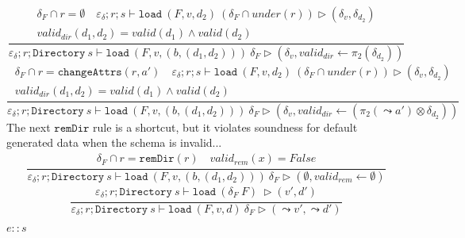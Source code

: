\documentclass{report}
\theoremstyle{theorem}
\begin{document}
\begin{displaymath}
	\frac{\begin{array}{c}
		\delta_F \cap r = \emptyset \quad
		\varepsilon_\delta ; r ; s \vdash \mathtt{load}~ (F,v,d_2)~ (\delta_F \cap under(r)) \rhd (\delta_v,\delta_{d_2})\\
		valid_{dir}(d_1,d_2) = valid(d_1) \wedge valid (d_2)
	\end{array}}
	{\varepsilon_\delta ; r ; \mathtt{Directory}~s \vdash \mathtt{load}~ (F,v,(b,(d_1,d_2)))~ \delta_F \rhd (\delta_v,valid_{dir} \leftarrow \pi_2(\delta_{d_2}))}
\end{displaymath}
\begin{displaymath}
	\frac{\begin{array}{c}
		\delta_F \cap r = \mathtt{changeAttrs}(r,a') \quad
		\varepsilon_\delta ; r ; s \vdash \mathtt{load}~ (F,v,d_2)~ (\delta_F \cap under(r)) \rhd (\delta_v,\delta_{d_2})\\
		valid_{dir}(d_1,d_2) = valid(d_1) \wedge valid (d_2)
	\end{array}}
	{\varepsilon_\delta ; r ; \mathtt{Directory}~s \vdash \mathtt{load}~ (F,v,(b,(d_1,d_2)))~ \delta_F \rhd (\delta_v,valid_{dir} \leftarrow (\pi_2(\leadsto a') \otimes \delta_{d_2}))}
\end{displaymath}
The next $\mathtt{remDir}$ rule is a shortcut, but it violates soundness for default generated data when the schema is invalid...
\begin{displaymath}
	\frac{\begin{array}{c}
		\delta_F \cap r = \mathtt{remDir}(r) \quad valid_{rem}(x) = False
	\end{array}}
	{\varepsilon_\delta ; r ; \mathtt{Directory}~s \vdash \mathtt{load}~ (F,v,(b,(d_1,d_2)))~ \delta_F \rhd (\emptyset,valid_{rem} \leftarrow \emptyset)}
\end{displaymath}
\begin{displaymath}
	\frac{\begin{array}{c}
		\varepsilon_\delta ; r ; \mathtt{Directory}~s \vdash \mathtt{load}~ (\delta_F~ F)~  \rhd (v',d')
	\end{array}}
	{\varepsilon_\delta ; r ; \mathtt{Directory}~s \vdash \mathtt{load}~ (F,v,d)~ \delta_F \rhd (\leadsto v',\leadsto d')}
\end{displaymath}

$\boxed{e :: s}$
\end{document}
